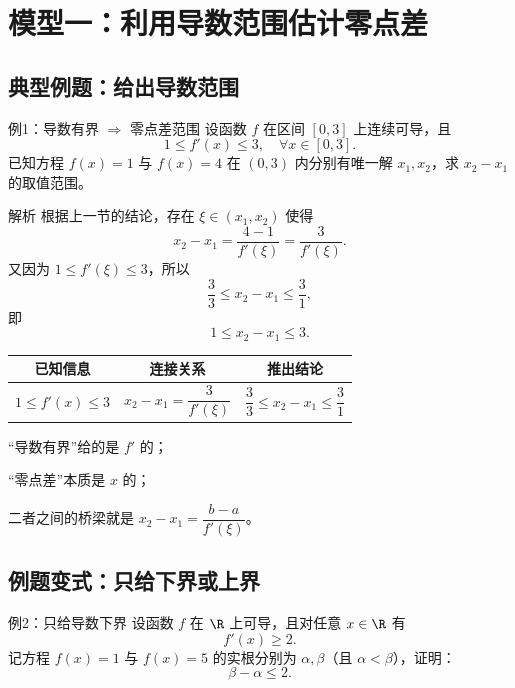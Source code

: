 \documentclass[a4paper,11pt]{ctexart}
\begin{document}
\newpage

\section{模型一：利用导数范围估计零点差}

\subsection{典型例题：给出导数范围}

\begin{examplebox}{例1：导数有界 $\Rightarrow$ 零点差范围}
设函数 $f$ 在区间 $[0,3]$ 上连续可导，且
\[
1 \le f'(x) \le 3,\quad \forall x\in[0,3].
\]
已知方程 $f(x)=1$ 与 $f(x)=4$ 在 $(0,3)$ 内分别有唯一解 $x_1,x_2$，求 $x_2-x_1$ 的取值范围。
\end{examplebox}

\begin{proofbox}{解析}
根据上一节的结论，存在 $\xi\in(x_1,x_2)$ 使得
\[
x_2-x_1 = \frac{4-1}{f'(\xi)} = \frac{3}{f'(\xi)}.
\]
又因为 $1\le f'(\xi)\le 3$，所以
\[
\frac{3}{3} \le x_2-x_1 \le \frac{3}{1},
\]
即
\[
1 \le x_2-x_1 \le 3.
\]
\end{proofbox}

\begin{center}
\begin{tabular}{c|c|c}
\hline
已知信息 & 连接关系 & 推出结论 \\
\hline
$1\le f'(x)\le 3$ & $x_2-x_1 = \dfrac{3}{f'(\xi)}$ & $\dfrac{3}{3}\le x_2-x_1\le\dfrac{3}{1}$ \\
\hline
\end{tabular}
\end{center}

\begin{focuspoints}
  \item “导数有界”给的是 $f'$ 的；
  \item “零点差”本质是 $x$ 的；
  \item 二者之间的桥梁就是 $x_2-x_1=\dfrac{b-a}{f'(\xi)}$。
\end{focuspoints}

\subsection{例题变式：只给下界或上界}

\begin{examplebox}{例2：只给导数下界}
设函数 $f$ 在 $\R$ 上可导，且对任意 $x\in\R$ 有
\[
f'(x) \geq 2.
\]
记方程 $f(x)=1$ 与 $f(x)=5$ 的实根分别为 $\alpha,\beta$（且 $\alpha<\beta$），证明：
\[
\beta-\alpha \leq 2.
\]
\end{examplebox}
\end{document}
